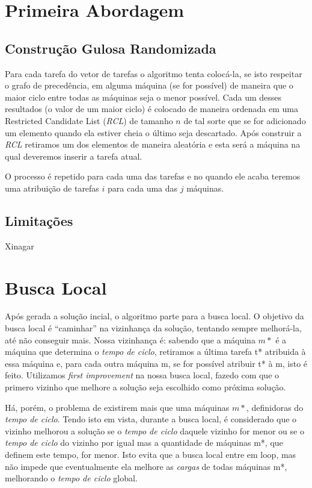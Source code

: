 \documentclass{report}
\begin{document}
\section{Primeira Abordagem}

\subsection{Construção Gulosa Randomizada}

Para cada tarefa do vetor de tarefas o algoritmo tenta colocá-la, se
isto respeitar o grafo de precedência, em alguma
máquina (se for possível) de maneira que o maior ciclo entre todas as máquinas
seja o menor possível. Cada um desses resultados (o valor de um maior ciclo)
é colocado de maneira ordenada em uma Restricted Candidate List (\emph{RCL})
de tamanho $n$ de tal sorte que se for adicionado um elemento quando ela estiver
cheia o último seja descartado. Após construir a \emph{RCL} retiramos um dos
elementos de maneira aleatória e esta será a máquina na qual deveremos inserir
a tarefa atual.

O processo é repetido para cada uma das tarefas e no quando ele acaba teremos
uma atribuição de tarefas $i$ para cada uma das $j$ máquinas.

\subsection{Limitações}

Xinagar

\section{Busca Local}

Após gerada a solução incial, o algoritmo parte para a busca local.
O objetivo da busca local é ``caminhar'' na
vizinhança da solução, tentando sempre melhorá-la, até não conseguir mais.
Nossa vizinhança é: sabendo que a máquina $m*$
é a máquina que determina o \emph{tempo de ciclo},
retiramos a última tarefa t* atribuida à essa máquina e, para cada
outra máquina m, se for possível atribuir t* à m, isto é feito.
Utilizamos \textit{first improvement} na nossa busca
local, fazedo com que o primero vizinho que melhore a solução seja
escolhido como próxima solução.

Há, porém, o problema de existirem mais que uma máquinas $m*$,
definidoras do \emph{tempo de ciclo}. Tendo isto em vista,
durante a busca local, é considerado que o vizinho melhorou a
solução se o \emph{tempo de ciclo} daquele vizinho for
menor ou se o \emph{tempo de ciclo} do vizinho por igual mas a
quantidade de máquinas m*, que definem este tempo, for
menor. Isto evita que a busca local entre em loop, mas não impede que
eventualmente ela melhore as \emph{cargas} de
todas máquinas m*, melhorando o \emph{tempo de ciclo} global.
\end{document}
